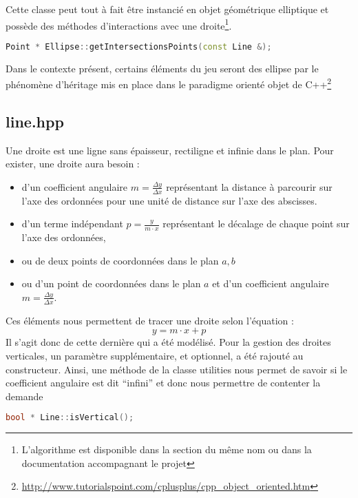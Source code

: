 \documentclass[a4paper,11pt]{report}
\begin{document}
Cette classe peut tout à fait être instancié en objet géométrique elliptique
et possède des méthodes d'interactions avec une droite\footnote{L'algorithme
	est disponible dans la section du même nom ou dans la documentation
accompagnant le projet}.
\begin{lstlisting}[frame=single,language=C++]
Point * Ellipse::getIntersectionsPoints(const Line &);
\end{lstlisting}
Dans le contexte présent, certains éléments du jeu seront des ellipse par le 
phénomène d'héritage mis en place dans le paradigme orienté objet de
C++\footnote{\url{http://www.tutorialspoint.com/cplusplus/cpp_object_oriented.htm}}

\subsection[Droite]{line.hpp}
\begin{center}
\end{center}
Une droite est une ligne sans épaisseur, rectiligne et infinie dans le plan. 
Pour exister, une droite aura besoin :
\begin{itemize}
	\item d'un coefficient angulaire $m = \frac{\Delta y}{\Delta x}$
		représentant la distance à parcourir sur l'axe des ordonnées pour une unité de
		distance sur l'axe des abscisses.
	\item d'un terme indépendant $p = \frac{y}{m \cdot x}$ représentant le décalage de chaque point
		sur l'axe des ordonnées,
	\item ou de deux points de coordonnées dans le plan $a, b$
	\item ou d'un point de coordonnées dans le plan $a$ et d'un coefficient
		angulaire $m = \frac{\Delta y}{\Delta x}$.
\end{itemize}
Ces éléments nous permettent de tracer une droite selon l'équation :
$$y = m \cdot x + p$$
Il s'agit donc de cette dernière qui a été modélisé. Pour la gestion des droites
verticales, un paramètre supplémentaire, et optionnel, a été rajouté au
constructeur. Ainsi, une méthode de la classe utilities nous permet de savoir si le
coefficient angulaire est dit ``infini'' et donc nous permettre de contenter la
demande
\begin{lstlisting}[frame=single,language=C++]
bool * Line::isVertical();
\end{lstlisting}
\end{document}
